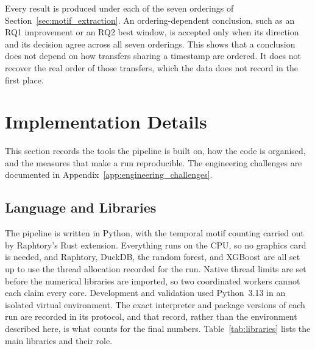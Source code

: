 \documentclass{thesisclass}
\begin{document}
Every result is produced under each of the seven orderings of
Section~\ref{sec:motif_extraction}. An ordering-dependent conclusion, such as an
RQ1 improvement or an RQ2 best window, is accepted only when its direction and its
decision agree across all seven orderings. This shows that a conclusion does not
depend on how transfers sharing a timestamp are ordered. It does not recover the
real order of those transfers, which the data does not record in the first place.

\section{Implementation Details}
\label{sec:implementation}

This section records the tools the pipeline is built on, how the code is
organised, and the measures that make a run reproducible. The engineering
challenges are documented in Appendix~\ref{app:engineering_challenges}.

\subsection{Language and Libraries}

The pipeline is written in Python, with the temporal motif counting carried out by
Raphtory's Rust extension. Everything runs on the CPU, so no graphics card is
needed, and Raphtory, DuckDB, the random forest, and XGBoost are all set up to use
the thread allocation recorded for the run. Native thread limits are set before
the numerical libraries are imported, so two coordinated workers cannot each
claim every core. Development and validation used
Python~3.13 in an isolated virtual environment. The exact interpreter and package
versions of each run are recorded in its protocol, and that record, rather than the
environment described here, is what counts for the final numbers.
Table~\ref{tab:libraries} lists the main libraries and their role.
\end{document}
